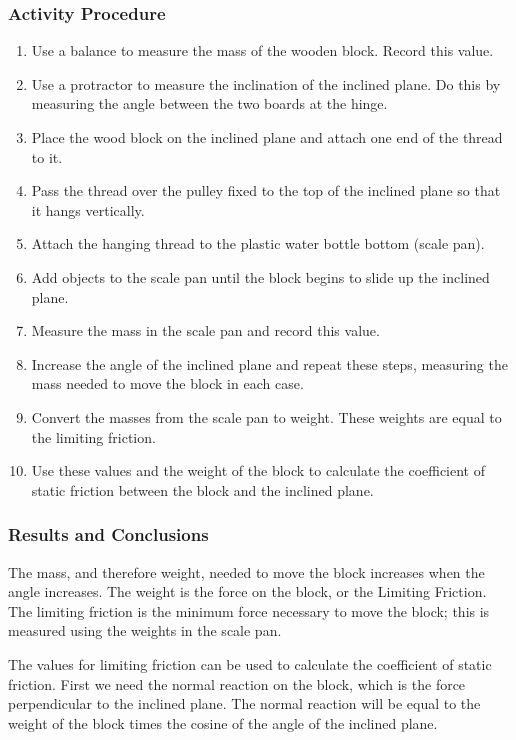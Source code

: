 \subsubsection*{Activity Procedure}
\begin{enumerate}
\item{Use a balance to measure the mass of the wooden block. Record this value.} 
\item{Use a protractor to measure the inclination of the inclined plane. Do this by measuring the angle between the two boards at the hinge.} 
\item{Place the wood block on the inclined plane and attach one end of the thread to it.} 
\item{Pass the thread over the pulley fixed to the top of the inclined plane so that it hangs vertically.} 
\item{Attach the hanging thread to the plastic water bottle bottom (scale pan).} 
\item{Add objects to the scale pan until the block begins to slide up the inclined plane.} 
\item{Measure the mass in the scale pan and record this value.} 
\item{Increase the angle of the inclined plane and repeat these steps, measuring the mass needed to move the block in each case.} 
\item{Convert the masses from the scale pan to weight. These weights are equal to the limiting friction.} 
\item{Use these values and the weight of the block to calculate the coefficient of static friction between the block and the inclined plane.} 
\end{enumerate}

\subsubsection*{Results and Conclusions}
The mass, and therefore weight, needed to move the block increases when the angle increases. The weight is the force on the block, or the Limiting Friction. The limiting friction is the minimum force necessary to move the block; this is measured using the weights in the scale pan.  

The values for limiting friction can be used to calculate the coefficient of static friction. First we need the normal reaction on the block, which is the force perpendicular to the inclined plane. The normal reaction will be equal to the weight of the block times the cosine of the angle of the inclined plane.  

